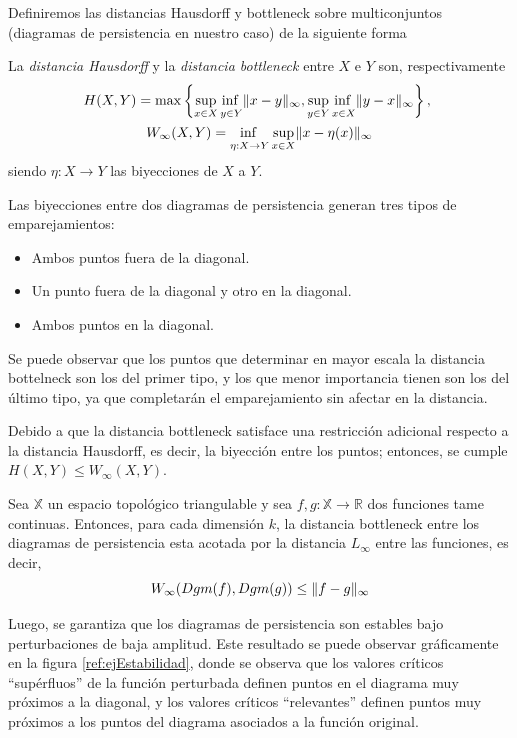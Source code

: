 Definiremos las distancias Hausdorff y bottleneck sobre multiconjuntos (diagramas de persistencia en nuestro caso) de la siguiente forma
\begin{definition}
La \emph{distancia Hausdorff} y la \emph{distancia bottleneck} entre $X$ e $Y$ son, respectivamente
\begin{gather*}
H(X, Y) = \max\left\{ \adjustlimits\sup_{x\in X} \inf_{y\in Y} \norm{x-y}_\infty, \adjustlimits\sup_{y\in Y} \inf_{x\in X} \norm{y-x}_\infty \right\},\ \\
W_\infty(X, Y) = \adjustlimits\inf_{\eta: X \to Y} \sup_{x\in X} \norm{x-\eta(x)}_\infty
\end{gather*}
siendo $\eta: X \to Y$ las biyecciones de $X$ a $Y$.
\end{definition}
Las biyecciones entre dos diagramas de persistencia generan tres tipos de emparejamientos:
\begin{itemize}
	\item Ambos puntos fuera de la diagonal.
	\item Un punto fuera de la diagonal y otro en la diagonal.
	\item Ambos puntos en la diagonal.
\end{itemize}
Se puede observar que los puntos que determinar en mayor escala la distancia bottelneck son los del primer tipo, y los que menor importancia tienen son los del último tipo, ya que completarán el emparejamiento sin afectar en la distancia.

\begin{remark}
Debido a que la distancia bottleneck satisface una restricción adicional respecto a la distancia Hausdorff, es decir, la biyección entre los puntos; entonces, se cumple $H(X, Y) \leq W_\infty(X, Y)$.
\end{remark}

\begin{theorem}
Sea $\mathbb{X}$ un espacio topológico triangulable y sea $f,g: \mathbb{X} \to \mathbb{R}$ dos funciones tame continuas. Entonces, para cada dimensión $k$, la distancia bottleneck entre los diagramas de persistencia esta acotada por la distancia $L_\infty$ entre las funciones, es decir,
\[
W_\infty(Dgm(f), Dgm(g)) \leq \lVert f-g\rVert_\infty
\]
\end{theorem}

Luego, se garantiza que los diagramas de persistencia son estables bajo perturbaciones de baja amplitud. Este resultado se puede observar gráficamente en la figura \ref{ref:ejEstabilidad}, donde se observa que los valores críticos ``supérfluos'' de la función perturbada definen puntos en el diagrama muy próximos a la diagonal, y los valores críticos ``relevantes'' definen puntos muy próximos a los puntos del diagrama asociados a la función original.

